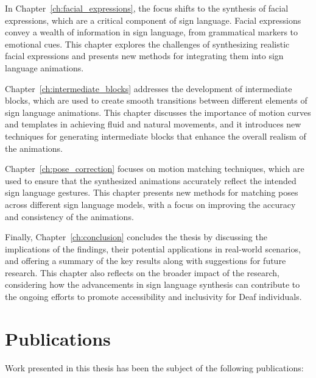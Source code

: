 \documentclass[../../main.tex]{subfiles}
\begin{document}
In Chapter~\ref{ch:facial_expressions}, the focus shifts to the synthesis of facial expressions, which are a critical component of sign language. Facial expressions convey a wealth of information in sign language, from grammatical markers to emotional cues. This chapter explores the challenges of synthesizing realistic facial expressions and presents new methods for integrating them into sign language animations.

Chapter~\ref{ch:intermediate_blocks} addresses the development of intermediate blocks, which are used to create smooth transitions between different elements of sign language animations. This chapter discusses the importance of motion curves and templates in achieving fluid and natural movements, and it introduces new techniques for generating intermediate blocks that enhance the overall realism of the animations.

Chapter~\ref{ch:pose_correction} focuses on motion matching techniques, which are used to ensure that the synthesized animations accurately reflect the intended sign language gestures. This chapter presents new methods for matching poses across different sign language models, with a focus on improving the accuracy and consistency of the animations.

Finally, Chapter~\ref{ch:conclusion} concludes the thesis by discussing the implications of the findings, their potential applications in real-world scenarios, and offering a summary of the key results along with suggestions for future research. This chapter also reflects on the broader impact of the research, considering how the advancements in sign language synthesis can contribute to the ongoing efforts to promote accessibility and inclusivity for Deaf individuals.

\section{Publications}

Work presented in this thesis has been the subject of the following publications:

\end{document}
